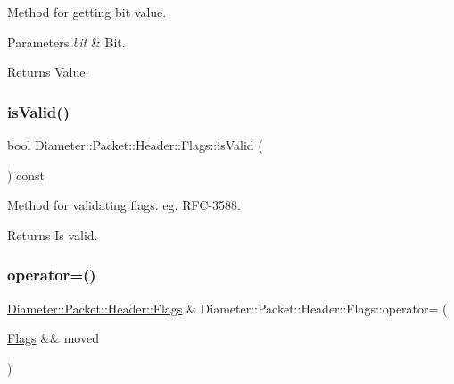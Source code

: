 Method for getting bit value. 


\begin{DoxyParams}{Parameters}
{\em bit} & Bit. \\
\hline
\end{DoxyParams}
\begin{DoxyReturn}{Returns}
Value. 
\end{DoxyReturn}
\mbox{\label{classDiameter_1_1Packet_1_1Header_1_1Flags_ae577fd786c656522b958395fb140dd8d}} 
\subsubsection{\texorpdfstring{is\+Valid()}{isValid()}}
{\footnotesize\ttfamily bool Diameter\+::\+Packet\+::\+Header\+::\+Flags\+::is\+Valid (\begin{DoxyParamCaption}{ }\end{DoxyParamCaption}) const}



Method for validating flags. eg. R\+F\+C-\/3588. 

\begin{DoxyReturn}{Returns}
Is valid. 
\end{DoxyReturn}
\mbox{\label{classDiameter_1_1Packet_1_1Header_1_1Flags_afd99abaebff289fdc859696929fea0da}} 
\subsubsection{\texorpdfstring{operator=()}{operator=()}}
{\footnotesize\ttfamily \hyperlink{classDiameter_1_1Packet_1_1Header_1_1Flags}{Diameter\+::\+Packet\+::\+Header\+::\+Flags} \& Diameter\+::\+Packet\+::\+Header\+::\+Flags\+::operator= (\begin{DoxyParamCaption}\item[{\hyperlink{classDiameter_1_1Packet_1_1Header_1_1Flags}{Flags} \&\&}]{moved }\end{DoxyParamCaption})\hspace{0.3cm}{\ttfamily [noexcept]}}



